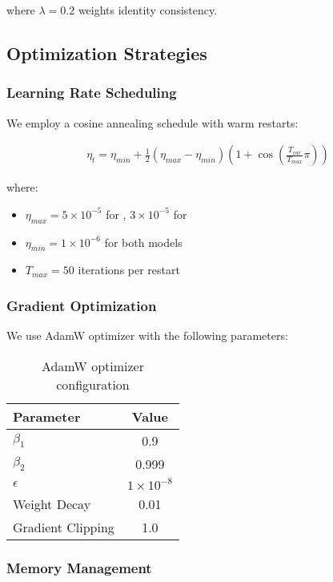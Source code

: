 where $\lambda = 0.2$ weights identity consistency.

\subsection{Optimization Strategies}

\subsubsection{Learning Rate Scheduling}

We employ a cosine annealing schedule with warm restarts:

\begin{align}
\eta_t = \eta_{min} + \frac{1}{2}(\eta_{max} - \eta_{min})(1 + \cos(\frac{T_{cur}}{T_{max}}\pi))
\end{align}

where:
\begin{itemize}
    \item $\eta_{max} = 5 \times 10^{-5}$ for \supra{}, $3 \times 10^{-5}$ for \zennano{}
    \item $\eta_{min} = 1 \times 10^{-6}$ for both models
    \item $T_{max} = 50$ iterations per restart
\end{itemize}

\subsubsection{Gradient Optimization}

We use AdamW optimizer with the following parameters:

\begin{table}[H]
\centering
\begin{tabular}{lc}
\toprule
Parameter & Value \\
\midrule
$\beta_1$ & 0.9 \\
$\beta_2$ & 0.999 \\
$\epsilon$ & $1 \times 10^{-8}$ \\
Weight Decay & 0.01 \\
Gradient Clipping & 1.0 \\
\bottomrule
\end{tabular}
\caption{AdamW optimizer configuration}
\label{tab:optimizer}
\end{table}

\subsubsection{Memory Management}

